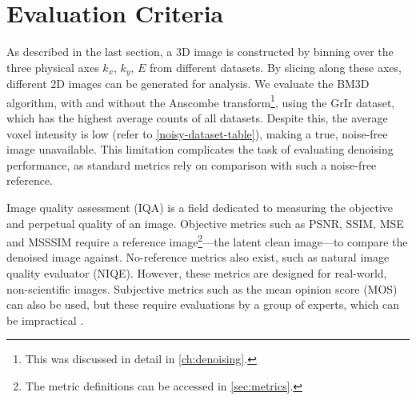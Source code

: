 \section{Evaluation Criteria}
As described in the last section, a 3D image is constructed by binning over the three physical axes $k_x$, $k_y$, $E$ from different datasets. By slicing along these axes, different 2D images can be generated for analysis. We evaluate the \gls{BM3D} algorithm, with and without the Anscombe transform\footnote{This was discussed in detail in \cref{ch:denoising}.}, using the \gls{GrIr} dataset, which has the highest average counts of all datasets. Despite this, the average voxel intensity is low (refer to \cref{noisy-dataset-table}), making a true, noise-free image unavailable. This limitation complicates the task of evaluating denoising performance, as standard metrics rely on comparison with such a noise-free reference.

Image quality assessment (IQA) is a field dedicated to measuring the objective and perpetual quality of an image. Objective metrics such as \gls{PSNR}, \gls{SSIM}, \gls{MSE} and \gls{MSSSIM} require a reference image\footnote{The metric definitions can be accessed in \cref{sec:metrics}.}---the latent clean image---to compare the denoised image against. No-reference metrics also exist, such as natural image quality evaluator (NIQE). However, these metrics are designed for real-world, non-scientific images. Subjective metrics such as the mean opinion score (MOS) can also be used, but these require evaluations by a group of experts, which can be impractical \cite{eskiciogluImageQualityMeasures1995,linzhangFSIMFeatureSimilarity2011}.

